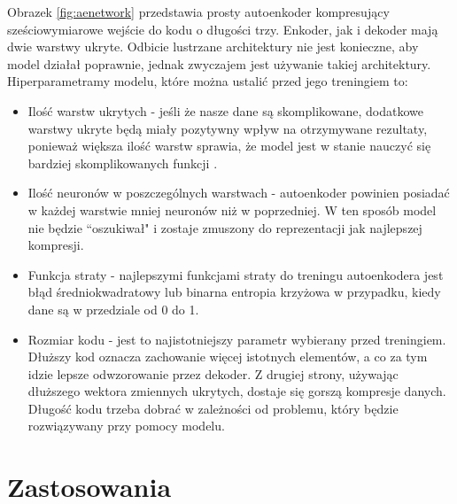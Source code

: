 \documentclass[a4paper,12pt,oneside]{book} %
\begin{document}
Obrazek \ref{fig:aenetwork} \cite{tikzae} przedstawia prosty autoenkoder kompresujący sześciowymiarowe wejście do kodu o długości trzy. Enkoder, jak i dekoder mają dwie warstwy ukryte. Odbicie lustrzane architektury nie jest konieczne, aby model działał poprawnie, jednak zwyczajem jest używanie takiej architektury.\\
Hiperparametramy modelu, które można ustalić przed jego treningiem to:
\begin{itemize}
	\item Ilość warstw ukrytych - jeśli że nasze dane są skomplikowane, dodatkowe warstwy ukryte będą miały pozytywny wpływ na otrzymywane rezultaty, ponieważ większa ilość warstw sprawia, że model jest w stanie nauczyć się bardziej skomplikowanych funkcji \cite{telgarsky2016benefits, eldan2016power}.
	\item Ilość neuronów w poszczególnych warstwach - autoenkoder powinien posiadać w każdej warstwie mniej neuronów niż w poprzedniej. W ten sposób model nie będzie ``oszukiwał" i zostaje zmuszony do reprezentacji jak najlepszej kompresji.
	\item Funkcja straty - najlepszymi funkcjami straty do treningu autoenkodera jest błąd średniokwadratowy lub binarna entropia krzyżowa w przypadku, kiedy dane są w przedziale od 0 do 1.
	\item Rozmiar kodu - jest to najistotniejszy parametr wybierany przed treningiem. Dłuższy kod oznacza zachowanie więcej istotnych elementów, a co za tym idzie lepsze odwzorowanie przez dekoder. Z drugiej strony, używając dłuższego wektora zmiennych ukrytych, dostaje się gorszą kompresje danych. Długość kodu trzeba dobrać w zależności od problemu, który będzie rozwiązywany przy pomocy modelu.
\end{itemize}
\section{Zastosowania}
\end{document}
